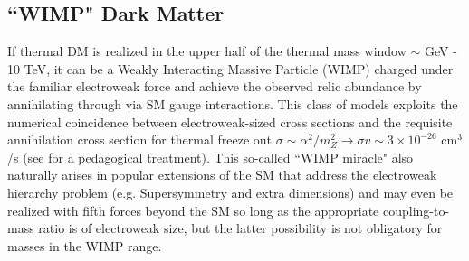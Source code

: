 \subsection{``WIMP" Dark Matter}
If thermal DM is realized in the upper half of the thermal mass window $\sim$ GeV - 10 TeV, it can be a Weakly Interacting Massive Particle (WIMP) charged under the 
familiar electroweak force and achieve the observed
relic abundance by annihilating through via SM gauge interactions.  This class of models exploits the numerical
 coincidence between electroweak-sized cross sections and the requisite annihilation cross section for thermal freeze out $\sigma \sim \alpha^2 /m_Z^2  \to \sigma v \sim 3 \times 10^{-26}$ cm$^3$/s (see \cite{Kolb:1990vq} for a pedagogical treatment). This so-called ``WIMP miracle" also naturally arises in popular extensions of the SM that address the electroweak hierarchy problem 
(e.g. Supersymmetry and extra dimensions) and may even be realized with fifth forces beyond the SM so long as the appropriate coupling-to-mass
ratio is of electroweak size, but the latter possibility is not obligatory for masses in the WIMP range.  


